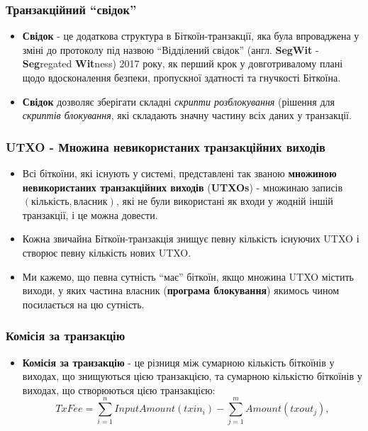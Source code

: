 \documentclass{beamer}
\begin{document}
\begin{frame}
  \frametitle{Транзакційний ``свідок''}
  \begin{itemize}
  \item \textbf{Свідок} - це додаткова структура в Біткоїн-транзакції, яка була
    впроваджена у зміні до протоколу під назвою ``Відділений свідок'' (англ. \textbf{SegWit} -
    \textbf{Seg}regated \textbf{Wit}ness) 2017 року, як перший крок у
    довготривалому плані щодо вдосконалення безпеки, пропускної здатності та
    гнучкості Біткоїна.
  \item \textbf{Свідок} дозволяє зберігати складні \textit{скрипти розблокування}
    (рішення для \textit{скриптів блокування}, які складають значну частину всіх
    даних у транзакції.
  \end{itemize}
\end{frame}

\begin{frame}
  \frametitle{UTXO - Множина невикористаних транзакційних виходів}
  \begin{itemize}
  \item Всі біткоїни, які існують у системі, представлені так званою
    \textbf{множиною невикористаних транзакційних виходів} (\textbf{UTXOs}) -
    множинаю записів $(кількість, власник)$, які не були використані як входи у
    жодній іншій транзакції, і це можна довести.
  \item Кожна звичайна Біткоїн-транзакція знищує певну кількість існуючих UTXO і
    створює певну кількість нових UTXO.
  \item Ми кажемо, що певна сутність ``має'' біткоїн, якщо множина UTXO містить
    виходи, у яких частина $власник$ (\textbf{програма блокування}) якимось
    чином посилається на цю сутність.
  \end{itemize}
\end{frame}

\begin{frame}[fragile]
  \frametitle{Комісія за транзакцію}
  \begin{itemize}
  \item \textbf{Комісія за транзакцію} - це різниця між сумарною кількість
    біткоїнів у виходах, що знищуються цією транзакцією, та сумарною кількістю
    біткоїнів у виходах, що створюються цією транзакцією:
    $$TxFee = \sum_{i=1}^n InputAmount(txin_i) - \sum_{j=1}^m Amount(txout_j),$$
  \end{itemize}
\end{frame}
\end{document}

